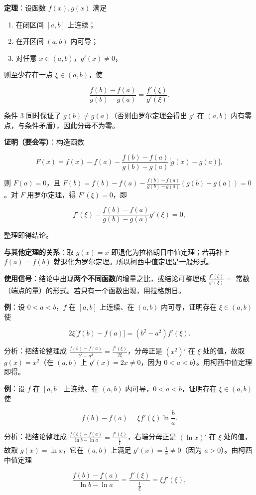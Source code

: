 \documentclass[11pt,openany,UTF8]{ctexbook}
\begin{document}
\textbf{定理}：设函数 $f(x),g(x)$ 满足

\begin{enumerate}
\item 在闭区间 $[a,b]$ 上连续；
\item 在开区间 $(a,b)$ 内可导；
\item 对任意 $x\in(a,b)$，$g'(x)\ne0$，
\end{enumerate}
则至少存在一点 $\xi\in(a,b)$，使

\[\frac{f(b)-f(a)}{g(b)-g(a)}=\frac{f'(\xi)}{g'(\xi)}.\]

条件 3 同时保证了 $g(b)\ne g(a)$（否则由罗尔定理会得出 $g'$ 在 $(a,b)$ 内有零点，与条件矛盾），因此分母不为零。

\textbf{证明（要会写）}：构造函数

\[F(x)=f(x)-f(a)-\frac{f(b)-f(a)}{g(b)-g(a)}\big[g(x)-g(a)\big],\]

则 $F(a)=0$，且 $F(b)=f(b)-f(a)-\frac{f(b)-f(a)}{g(b)-g(a)}(g(b)-g(a))=0$。对 $F$ 用罗尔定理，得 $F'(\xi)=0$，即

\[f'(\xi)-\frac{f(b)-f(a)}{g(b)-g(a)}g'(\xi)=0,\]

整理即得结论。

\textbf{与其他定理的关系}：取 $g(x)=x$ 即退化为拉格朗日中值定理；若再补上 $f(a)=f(b)$ 就退化为罗尔定理。所以柯西中值定理是一般形式。

\textbf{使用信号}：结论中出现\textbf{两个不同函数}的增量之比，或结论可整理成 $\frac{f'(\xi)}{g'(\xi)}=$ 常数（端点的量）的形式。若只有一个函数出现，用拉格朗日。

\textbf{例}：设 $0<a<b$，$f$ 在 $[a,b]$ 上连续、在 $(a,b)$ 内可导，证明存在 $\xi\in(a,b)$ 使

\[2\xi\big[f(b)-f(a)\big]=(b^2-a^2)f'(\xi).\]

分析：把结论整理成 $\frac{f(b)-f(a)}{b^2-a^2}=\frac{f'(\xi)}{2\xi}$，分母正是 $(x^2)'$ 在 $\xi$ 处的值，故取 $g(x)=x^2$（在 $(a,b)$ 上 $g'(x)=2x\ne0$，因为 $0<a<b$）。用柯西中值定理即得。

\textbf{例}：设 $f$ 在 $[a,b]$ 上连续、在 $(a,b)$ 内可导，$0<a<b$，证明存在 $\xi\in(a,b)$ 使

\[f(b)-f(a)=\xi f'(\xi)\ln\frac ba .\]

分析：把结论整理成 $\frac{f(b)-f(a)}{\ln b-\ln a}=\frac{f'(\xi)}{\frac1\xi}$，右端分母正是 $(\ln x)'$ 在 $\xi$ 处的值，故取 $g(x)=\ln x$，它在 $(a,b)$ 上满足 $g'(x)=\frac1x\ne0$（因为 $a>0$）。由柯西中值定理

\[\frac{f(b)-f(a)}{\ln b-\ln a}=\frac{f'(\xi)}{\frac1\xi}=\xi f'(\xi),\]
\end{document}
